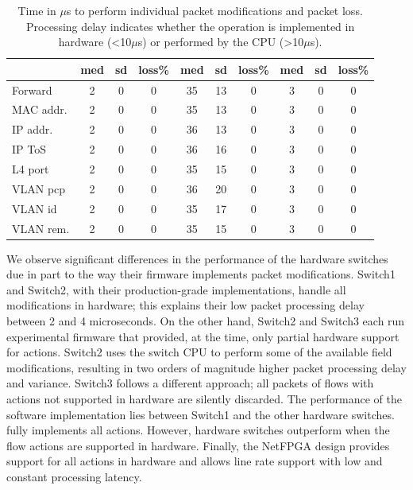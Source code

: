 \begin{table}[tb]
\begin{tabular}[t]{|l | c | c | c || c | c | c || c | c | c |}
              & med & sd & loss\% & med & sd & loss\% & med & sd & loss\% \\ \hline  
    Forward   & 2   & 0  & 0      & 35  & 13 & 0      & 3   & 0  & 0      \\\hline  
    MAC addr. & 2   & 0  & 0      & 35  & 13 & 0      & 3   & 0  & 0      \\ \hline  
    IP addr.  & 2   & 0  & 0      & 36  & 13 & 0      & 3   & 0  & 0      \\ \hline  
    IP ToS    & 2   & 0  & 0      & 36  & 16 & 0      & 3   & 0  & 0      \\ \hline  
    L4 port   & 2   & 0  & 0      & 35  & 15 & 0      & 3   & 0  & 0      \\ \hline  
    VLAN pcp  & 2   & 0  & 0      & 36  & 20 & 0      & 3   & 0  & 0      \\ \hline  
    VLAN id   & 2   & 0  & 0      & 35  & 17 & 0      & 3   & 0  & 0      \\ \hline  
    VLAN rem. & 2   & 0  & 0      & 35  & 15 & 0      & 3   & 0  & 0      \\ \hline
  \end{tabular}
 
  \caption[Switch action latency.]{Time in $\mu$s to perform individual packet
    modifications and packet loss. Processing delay indicates whether the
    operation is implemented in hardware (\textless10$\mu$s) or performed by
    the CPU (\textgreater10$\mu$s).}
  \label{tbl:feature_delay}
\end{table}

We observe significant differences in the performance of the hardware switches
due in part to the way their firmware implements packet modifications. Switch1
and Switch2, with their production-grade implementations, handle all
modifications in hardware; this explains their low packet processing delay
between 2 and 4 microseconds. On the other hand, Switch2 and Switch3 each run
experimental firmware that provided, at the time, only partial hardware support
for \of actions. Switch2 uses the switch CPU to perform some of the available
field modifications, resulting in two orders of magnitude higher packet
processing delay and variance.  Switch3 follows a different approach; all
packets of flows with actions not supported in hardware are silently discarded.
The performance of the \ovs software implementation lies between Switch1 and the
other hardware switches.  \ovs fully implements all \of actions. However,
hardware switches outperform \ovs when the flow actions are supported in
hardware. Finally, the NetFPGA design provides support for all actions in
hardware and allows line rate support with low and constant processing latency. 

